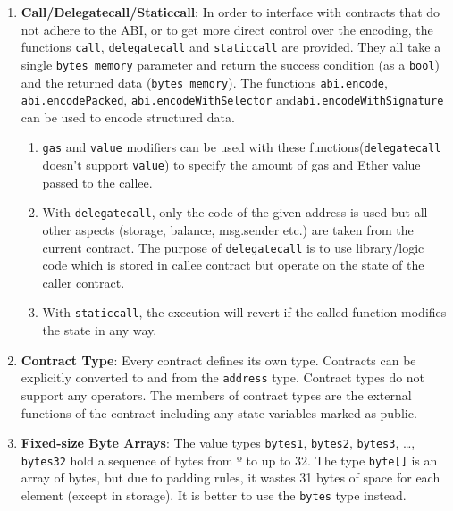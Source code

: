 \begin{enumerate}
\item\textbf{Call/Delegatecall/Staticcall}: In order to interface with contracts that do not adhere to the ABI, or to get more direct control over the encoding, the functions \verb|call|, \verb|delegatecall| and \verb|staticcall| are provided. They all take a single \verb|bytes memory| parameter and return the success condition (as a \verb|bool|) and the returned data (\verb|bytes memory|). The functions \verb|abi.encode|, \verb|abi.encodePacked|, \verb|abi.encodeWithSelector| and\linebreak\verb|abi.encodeWithSignature| can be used to encode structured data.
    \begin{enumerate}
    \item\verb|gas| and \verb|value| modifiers can be used with these functions\linebreak (\verb|delegatecall| doesn’t support \verb|value|) to specify the amount of gas and Ether value passed to the callee.
    \item With \verb|delegatecall|, only the code of the given address is used but all other aspects (storage, balance, msg.sender etc.) are taken from the current contract. The purpose of \verb|delegatecall| is to use library/logic code which is stored in callee contract but operate on the state of the caller contract.
    \item With \verb|staticcall|, the execution will revert if the called function modifies the state in any way.
    \end{enumerate}

\item\textbf{Contract Type}: Every contract defines its own type. Contracts can be explicitly converted to and from the \verb|address| type. Contract types do not support any operators. The members of contract types are the external functions of the contract including any state variables marked as public.

\item\textbf{Fixed-size Byte Arrays}: The value types \verb|bytes1|, \verb|bytes2|, \verb|bytes3|, \dots, \verb|bytes32| hold a sequence of bytes from º to up to 32. The type \verb|byte[]| is an array of bytes, but due to padding rules, it wastes 31 bytes of space for each element (except in storage). It is better to use the \verb|bytes| type instead.


\end{enumerate}
